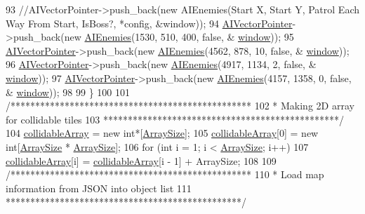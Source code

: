 \begin{DoxyCode}
93         \textcolor{comment}{//AIVectorPointer->push\_back(new AIEnemies(Start X, Start Y, Patrol Each Way From Start, IsBoss?,
       *config, &window));}
94         \hyperlink{classTestApp_ac409d674f567c5d2ea773bd7ec3036d9}{AIVectorPointer}->push\_back(\textcolor{keyword}{new} \hyperlink{classAIEnemies}{AIEnemies}(1530, 510, 400, \textcolor{keyword}{false}, &
      \hyperlink{classTestApp_a0b6b080a777092db64519ef7c4309105}{window}));
95         \hyperlink{classTestApp_ac409d674f567c5d2ea773bd7ec3036d9}{AIVectorPointer}->push\_back(\textcolor{keyword}{new} \hyperlink{classAIEnemies}{AIEnemies}(4562, 878, 10, \textcolor{keyword}{false}, &
      \hyperlink{classTestApp_a0b6b080a777092db64519ef7c4309105}{window}));
96         \hyperlink{classTestApp_ac409d674f567c5d2ea773bd7ec3036d9}{AIVectorPointer}->push\_back(\textcolor{keyword}{new} \hyperlink{classAIEnemies}{AIEnemies}(4917, 1134, 2, \textcolor{keyword}{false}, &
      \hyperlink{classTestApp_a0b6b080a777092db64519ef7c4309105}{window}));
97         \hyperlink{classTestApp_ac409d674f567c5d2ea773bd7ec3036d9}{AIVectorPointer}->push\_back(\textcolor{keyword}{new} \hyperlink{classAIEnemies}{AIEnemies}(4157, 1358, 0, \textcolor{keyword}{false}, &
      \hyperlink{classTestApp_a0b6b080a777092db64519ef7c4309105}{window}));
98 
99     \}
100 
101     \textcolor{comment}{/*************************************************}
102 \textcolor{comment}{     * Making 2D array for collidable tiles}
103 \textcolor{comment}{     ************************************************/}
104     \hyperlink{classTestApp_abd825724564edeb067da3c6f2c4a5f5f}{collidableArray} = \textcolor{keyword}{new} \textcolor{keywordtype}{int}*[\hyperlink{classTestApp_a980934e42fe32913bde240b0e68431dd}{ArraySize}];
105     \hyperlink{classTestApp_abd825724564edeb067da3c6f2c4a5f5f}{collidableArray}[0] = \textcolor{keyword}{new} \textcolor{keywordtype}{int}[\hyperlink{classTestApp_a980934e42fe32913bde240b0e68431dd}{ArraySize} * \hyperlink{classTestApp_a980934e42fe32913bde240b0e68431dd}{ArraySize}];
106     \textcolor{keywordflow}{for} (\textcolor{keywordtype}{int} i = 1; i < \hyperlink{classTestApp_a980934e42fe32913bde240b0e68431dd}{ArraySize}; i++)
107         \hyperlink{classTestApp_abd825724564edeb067da3c6f2c4a5f5f}{collidableArray}[i] = \hyperlink{classTestApp_abd825724564edeb067da3c6f2c4a5f5f}{collidableArray}[i - 1] + ArraySize;
108 
109     \textcolor{comment}{/*************************************************}
110 \textcolor{comment}{     * Load map information from JSON into object list}
111 \textcolor{comment}{     ************************************************/}

\end{DoxyCode}
